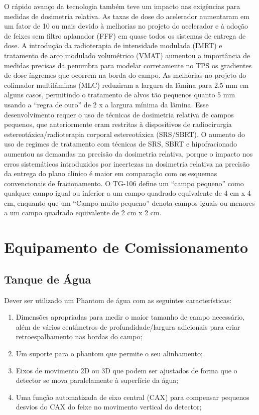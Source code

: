 \documentclass[11pt,a4paper]{article}
\begin{document}
	O rápido avanço da tecnologia também teve um impacto nas exigências para medidas de dosimetria relativa. As taxas de dose do acelerador aumentaram em um fator de 10 ou mais devido à melhorias no projeto do acelerador e à adoção de feixes sem filtro aplanador (FFF) em quase todos os sistemas de entrega de dose. A introdução da radioterapia de intensidade modulada (IMRT) e tratamento de arco modulado volumétrico (VMAT) aumentou a importância de medidas precisas da penumbra para modelar corretamente no TPS os gradientes de dose íngremes que ocorrem na borda do campo. As melhorias no projeto do colimador multilâminas (MLC) reduziram a largura da lâmina para 2.5 mm em alguns casos, permitindo o tratamento de alvos tão pequenos quanto 5 mm usando a ``regra de ouro'' de 2 x a largura mínima da lâmina. Esse desenvolvimento requer o uso de técnicas de dosimetria relativa de campos pequenos, que anteriormente eram restritas à dispositivos de radiocirurgia estereotáxica/radioterapia corporal estereotáxica (SRS/SBRT). O aumento do uso de regimes de tratamento com técnicas de SRS, SBRT e hipofracionado aumentou as demandas na precisão da dosimetria relativa, porque o impacto nos erros sistemáticos introduzidos por incertezas na dosimetria relativa na precisão da entrega do plano clínico é maior em comparação com os esquemas convencionais de fracionamento. O TG-106 define um “campo pequeno” como qualquer campo igual ou inferior a um campo quadrado equivalente de 4 cm x 4 cm, enquanto que um “Campo muito pequeno” denota campos iguais ou menores a um campo quadrado equivalente de 2 cm x 2 cm.

\section{Equipamento de Comissionamento}

\subsection*{Tanque de Água}

	Dever ser utilizado um Phantom de água com as seguintes características:

	\begin{enumerate}
		\item Dimensões apropriadas para medir o maior tamanho de campo necessário, além de vários centímetros de profundidade/largura adicionais para criar retroespalhamento nas bordas do campo;
		\item Um suporte para o phantom que permite o seu alinhamento;
		\item Eixos de movimento 2D ou 3D que podem ser ajustados de forma que o detector se mova paralelamente à superfície da água;
		\item Uma função automatizada de eixo central (CAX) para compensar pequenos desvios do CAX do feixe no movimento vertical do detector;
	\end{enumerate}
\end{document}
